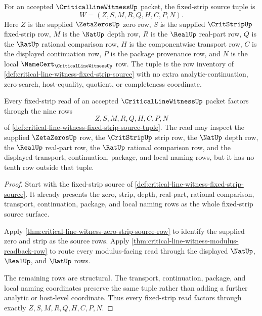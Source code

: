 \begin{definition}
\label{def:critical-line-witness-fixed-strip-source-tuple}
For an accepted $\CriticalLineWitnessUp$ packet, the fixed-strip source tuple is
$$
W=(Z,S,M,R,Q,H,C,P,N).
$$
Here $Z$ is the supplied $\ZetaZerosUp$ zero row, $S$ is the supplied $\CritStripUp$ fixed-strip row, $M$ is the $\NatUp$ depth row, $R$ is the $\RealUp$ real-part row, $Q$ is the $\RatUp$ rational comparison row, $H$ is the componentwise transport row, $C$ is the displayed continuation row, $P$ is the package provenance row, and $N$ is the local $\NameCert_{\CriticalLineWitnessUp}$ row. The tuple is the row inventory of \autoref{def:critical-line-witness-fixed-strip-source} with no extra analytic-continuation, zero-search, host-equality, quotient, or completeness coordinate.
\end{definition}

\begin{theorem}
\label{thm:critical-line-witness-fixed-strip-row-exhaustion}
Every fixed-strip read of an accepted $\CriticalLineWitnessUp$ packet factors through the nine rows
$$
Z,S,M,R,Q,H,C,P,N
$$
of \autoref{def:critical-line-witness-fixed-strip-source-tuple}. The read may inspect the supplied $\ZetaZerosUp$ row, the $\CritStripUp$ strip row, the $\NatUp$ depth row, the $\RealUp$ real-part row, the $\RatUp$ rational comparison row, and the displayed transport, continuation, package, and local naming rows, but it has no tenth row outside that tuple.
\end{theorem}
\begin{proof}
Start with the fixed-strip source of \autoref{def:critical-line-witness-fixed-strip-source}. It already presents the zero, strip, depth, real-part, rational comparison, transport, continuation, package, and local naming rows as the whole fixed-strip source surface.

Apply \autoref{thm:critical-line-witness-zero-strip-source-row} to identify the supplied zero and strip as the source rows. Apply \autoref{thm:critical-line-witness-modulus-readback-row} to route every modulus-facing read through the displayed $\NatUp$, $\RealUp$, and $\RatUp$ rows.

The remaining rows are structural. The transport, continuation, package, and local naming coordinates preserve the same tuple rather than adding a further analytic or host-level coordinate. Thus every fixed-strip read factors through exactly $Z,S,M,R,Q,H,C,P,N$.
\end{proof}

